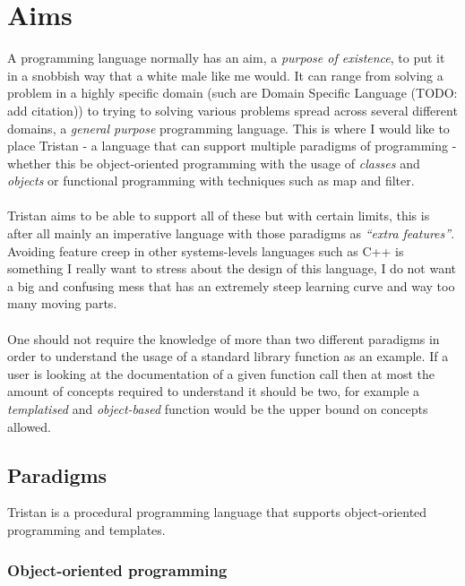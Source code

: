 
\chapter{Aims}

A programming language normally has an aim, a \emph{purpose of existence},
to put it in a snobbish way that a white male like me would. It can
range from solving a problem in a highly specific domain (such are
Domain Specific Language (TODO: add citation)) to trying to solving
various problems spread across several different domains, a \emph{general
purpose} programming language. This is where I would like to place
Tristan - a language that can support multiple paradigms of programming
- whether this be object-oriented programming with the usage of \emph{classes}
and \emph{objects} or functional programming with techniques such
as map and filter.\\
\\
Tristan aims to be able to support all of these but with certain limits,
this is after all mainly an imperative language with those paradigms
as \emph{``extra features''}. Avoiding feature creep in other systems-levels
languages such as C++ is something I really want to stress about the
design of this language, I do not want a big and confusing mess that
has an extremely steep learning curve and way too many moving parts.\\
\\
One should not require the knowledge of more than two different paradigms
in order to understand the usage of a standard library function as
an example. If a user is looking at the documentation of a given function
call then at most the amount of concepts required to understand it
should be two, for example a \emph{templatised} and \emph{object-based}
function would be the upper bound on concepts allowed.

\section{Paradigms}

Tristan is a procedural programming language that supports object-oriented
programming and templates.

\subsection{Object-oriented programming}

